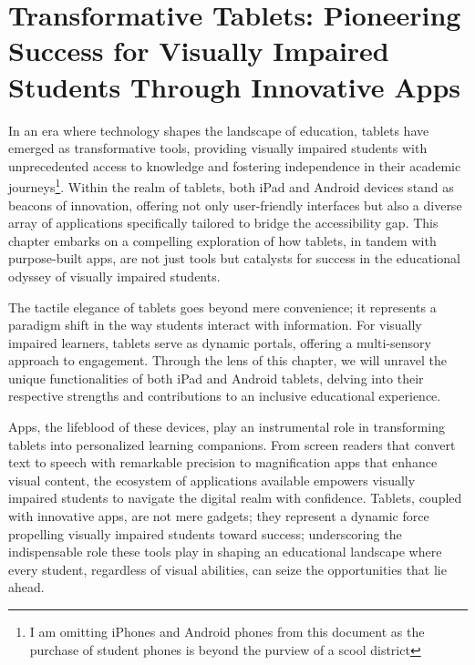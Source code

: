 \documentclass[12pt,letterpaper,twoside]{extreport}
\begin{document}
\pagebreak \hypertarget{ios-devices}{}\chapter[\raggedright Transformative Tablets: \\Pioneering Success for Visually Impaired Students Through Innovative Apps]{Transformative Tablets: Pioneering Success for Visually Impaired Students Through Innovative Apps}\label{ios-devices}
\minitoc
{}
In an era where technology shapes the landscape of education, tablets have emerged as transformative tools, providing visually impaired students with unprecedented access to knowledge and fostering independence in their academic journeys\footnote{I am omitting iPhones and Android phones from this document as the purchase of student phones is beyond the purview of a scool district}. Within the realm of tablets, both iPad and Android devices stand as beacons of innovation, offering not only user-friendly interfaces but also a diverse array of applications specifically tailored to bridge the accessibility gap. This chapter embarks on a compelling exploration of how tablets, in tandem with purpose-built apps, are not just tools but catalysts for success in the educational odyssey of visually impaired students.

The tactile elegance of tablets goes beyond mere convenience; it represents a paradigm shift in the way students interact with information. For visually impaired learners, tablets serve as dynamic portals, offering a multi-sensory approach to engagement. Through the lens of this chapter, we will unravel the unique functionalities of both iPad and Android tablets, delving into their respective strengths and contributions to an inclusive educational experience.

Apps, the lifeblood of these devices, play an instrumental role in transforming tablets into personalized learning companions. From screen readers that convert text to speech with remarkable precision to magnification apps that enhance visual content, the ecosystem of applications available empowers visually impaired students to navigate the digital realm with confidence. Tablets, coupled with innovative apps, are not mere gadgets; they represent a dynamic force propelling visually impaired students toward success; underscoring the indispensable role these tools play in shaping an educational landscape where every student, regardless of visual abilities, can seize the opportunities that lie ahead.
\end{document}
